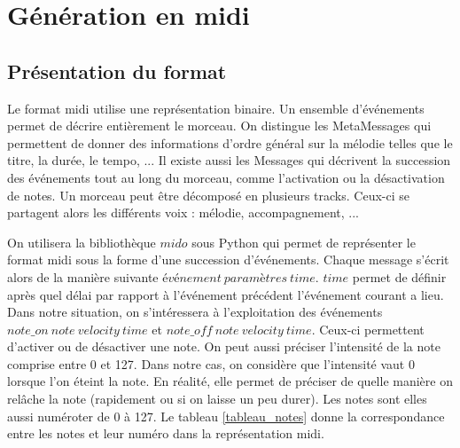 \section{Génération en midi}

\subsection{Présentation du format}

Le format midi utilise une représentation binaire. Un ensemble d'événements permet de décrire entièrement le morceau. On distingue les MetaMessages qui permettent de donner des informations d'ordre général sur la mélodie telles que le titre, la durée, le tempo, ... Il existe aussi les Messages qui décrivent la succession des événements tout au long du morceau, comme l'activation ou la désactivation de notes. Un morceau peut être décomposé en plusieurs tracks. Ceux-ci se partagent alors les différents voix : mélodie, accompagnement, ... 

On utilisera la bibliothèque $mido$ sous Python qui permet de représenter le format midi sous la forme d'une succession d'événements. Chaque message s'écrit alors de la manière suivante $événement\ paramètres\ time$. $time$ permet de définir après quel délai par rapport à l'événement précédent l'événement courant a lieu. Dans notre situation, on s'intéressera à l'exploitation des événements $note\_on\ note\ velocity\ time$ et $note\_off\ note\ velocity\ time$. Ceux-ci permettent d'activer ou de désactiver une note. On peut aussi préciser l'intensité de la note comprise entre 0 et 127. Dans notre cas, on considère que l'intensité vaut 0 lorsque l'on éteint la note. En réalité, elle permet de préciser de quelle manière on relâche la note (rapidement ou si on laisse un peu durer). Les notes sont elles aussi numéroter de 0 à 127. Le tableau \ref{tableau_notes} donne la correspondance entre les notes et leur numéro dans la représentation midi.

